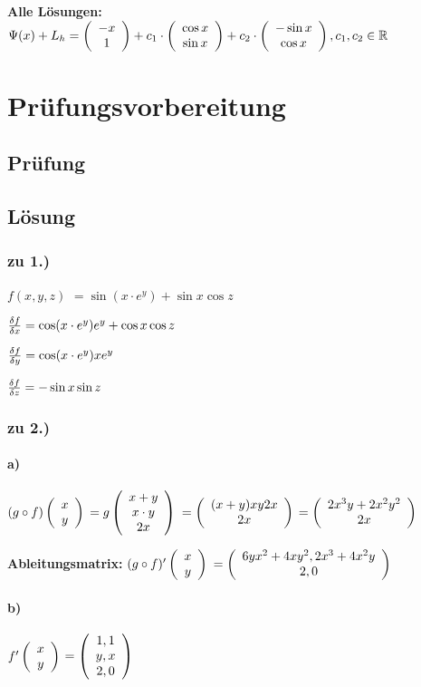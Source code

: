 \textbf{Alle Lösungen:}\\
$\Psi(x) + L_h = \vektor{-x\\1} + c_1 \cdot \vektor{\cos x \\ \sin x} + c_2 \cdot \vektor{-\sin x\\\cos x}, c_1,c_2 \in \R$

\section{Prüfungsvorbereitung}
\subsection{Prüfung}
% 

\subsection{Lösung}
\subsubsection{zu 1.)}

$f(x,y,z)$
$=\sin(x\cdot e^y) + \sin x \cos z$

$\frac{\df}{\dx} = \cos (x\cdot e^y) e^y + \cos x \cos z$

$\frac{\df}{\dy} = \cos (x\cdot e^y) x e^y $

$\frac{\df}{\dz} = -\sin x \sin z$

\subsubsection{zu 2.)}

\paragraph{a)}
$ (g\circ f) \vektor{x\\y} $
$= g\vektor{x+y\\x\cdot y\\2x}$
$=\vektor{(x+y) x y 2 x \\ 2x}$
$=\vektor{2x^3y + 2x^2y^2\\2x}$

\textbf{Ableitungsmatrix:}
$ (g\circ f)' \vektor{x\\y} $
$=\vektor{6yx^2 + 4xy^2, 2x^3 + 4x^2y\\2, 0}$

\paragraph{b)}
$f'\vektor{x\\y}$
$=\vektor{1,1\\y,x\\2,0}$

